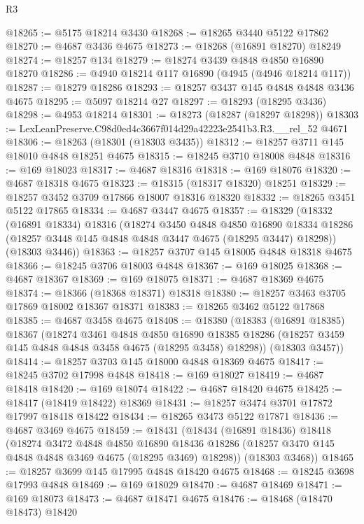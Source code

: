 \begin{lexlean}{R3}
\begin{coremodule}
@18265 := @5175 @18214 @3430
@18268 := @18265 @3440 @5122 @17862
@18270 := @4687 @3436 @4675
@18273 := @18268 (@16891 @18270) @18249
@18274 := @18257 @134
@18279 := @18274 @3439 @4848 @4850 @16890 @18270
@18286 := @4940 @18214 @117 @16890 (@4945 (@4946 @18214 @117))
@18287 := @18279 @18286
@18293 := @18257 @3437 @145 @4848 @4848 @3436 @4675
@18295 := @5097 @18214 @27
@18297 := @18293 (@18295 @3436)
@18298 := @4953 @18214
@18301 := @18273 (@18287 (@18297 @18298))
@18303 := LexLeanPreserve.C98d0ed4c3667f014d29a42223e2541b3.R3.__rel_52 @4671
@18306 := @18263 (@18301 (@18303 @3435))
@18312 := @18257 @3711 @145 @18010 @4848 @18251 @4675
@18315 := @18245 @3710 @18008 @4848
@18316 := @169 @18023
@18317 := @4687 @18316
@18318 := @169 @18076
@18320 := @4687 @18318 @4675
@18323 := @18315 (@18317 @18320) @18251
@18329 := @18257 @3452 @3709 @17866 @18007 @18316 @18320
@18332 := @18265 @3451 @5122 @17865
@18334 := @4687 @3447 @4675
@18357 := @18329
    (@18332
      (@16891 @18334)
      @18316
      (@18274
        @3450
        @4848
        @4850
        @16890
        @18334
        @18286
        (@18257 @3448 @145 @4848 @4848 @3447 @4675 (@18295 @3447) @18298))
      (@18303 @3446))
@18363 := @18257 @3707 @145 @18005 @4848 @18318 @4675
@18366 := @18245 @3706 @18003 @4848
@18367 := @169 @18025
@18368 := @4687 @18367
@18369 := @169 @18075
@18371 := @4687 @18369 @4675
@18374 := @18366 (@18368 @18371) @18318
@18380 := @18257 @3463 @3705 @17869 @18002 @18367 @18371
@18383 := @18265 @3462 @5122 @17868
@18385 := @4687 @3458 @4675
@18408 := @18380
    (@18383
      (@16891 @18385)
      @18367
      (@18274
        @3461
        @4848
        @4850
        @16890
        @18385
        @18286
        (@18257 @3459 @145 @4848 @4848 @3458 @4675 (@18295 @3458) @18298))
      (@18303 @3457))
@18414 := @18257 @3703 @145 @18000 @4848 @18369 @4675
@18417 := @18245 @3702 @17998 @4848
@18418 := @169 @18027
@18419 := @4687 @18418
@18420 := @169 @18074
@18422 := @4687 @18420 @4675
@18425 := @18417 (@18419 @18422) @18369
@18431 := @18257 @3474 @3701 @17872 @17997 @18418 @18422
@18434 := @18265 @3473 @5122 @17871
@18436 := @4687 @3469 @4675
@18459 := @18431
    (@18434
      (@16891 @18436)
      @18418
      (@18274
        @3472
        @4848
        @4850
        @16890
        @18436
        @18286
        (@18257 @3470 @145 @4848 @4848 @3469 @4675 (@18295 @3469) @18298))
      (@18303 @3468))
@18465 := @18257 @3699 @145 @17995 @4848 @18420 @4675
@18468 := @18245 @3698 @17993 @4848
@18469 := @169 @18029
@18470 := @4687 @18469
@18471 := @169 @18073
@18473 := @4687 @18471 @4675
@18476 := @18468 (@18470 @18473) @18420

\end{coremodule}
\end{lexlean}
